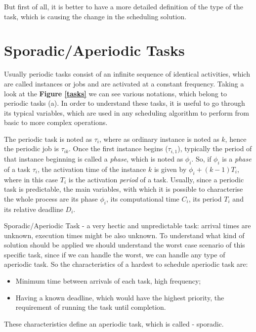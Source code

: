 \documentclass[conference]{IEEEtran}
\begin{document}
But first of all, it is better to have a more detailed definition of the type of the task, which is causing the change in the scheduling solution.

\section{Sporadic/Aperiodic Tasks}

Usually periodic tasks consist of an infinite sequence of identical activities, which are called instances or jobs and are activated at a constant frequency. Taking a look at the \textbf{Figure \ref{tasks}} we can see various notations, which belong to periodic tasks (a). In order to understand these tasks, it is useful to go through its typical variables, which are used in any scheduling algorithm to perform from basic to more complex operations.

The periodic task is noted as $\tau_i$, where as ordinary instance is noted as $k$, hence the periodic job is $\tau_{ik}$. Once the first instance begins ($\tau_{i,1}$), typically the period of that instance beginning is called a \textit{phase}, which is noted as $\phi_i$. So, if $\phi_i$ is a \textit{phase} of a task $\tau_i$, the activation time of the instance $k$ is given by $\phi_i + (k-1)T_i$, where in this case $T_i$ is the activation \textit{period} of a task. Usually, since a periodic task is predictable, the main variables, with which it is possible to characterise the whole process are its phase $\phi_i$, its computational time $C_i$, its period $T_i$ and its relative deadline $D_i$.

Sporadic/Aperiodic Task - a very hectic and unpredictable task: arrival times are unknown, execution times might be also unknown. To understand what kind of solution should be applied we should understand the worst case scenario of this specific task, since if we can handle the worst, we can handle any type of aperiodic task. So the characteristics of a hardest to schedule aperiodic task are:

\begin{itemize}
    \item Minimum time between arrivals of each task, high frequency;
    \item Having a known deadline, which would have the highest priority, the requirement of running the task until completion.
\end{itemize}

These characteristics define an aperiodic task, which is called - sporadic.
\end{document}
